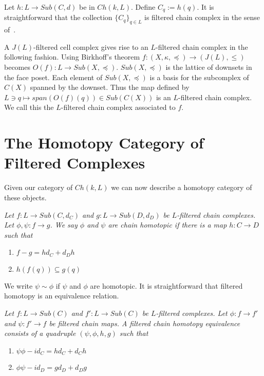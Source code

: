 \begin{rem}
Let $h:L\to Sub(C,d)$ be in $Ch(k,L)$.  Define $C_q := h(q)$. It is straightforward that the collection $\{C_q\}_{q\in L}$ is filtered chain complex in the sense of~\cite[Section 7]{salamon}.
\end{rem}


A $J(L)$-filtered cell complex gives rise to an $L$-filtered chain complex in the following fashion.   Using Birkhoff's theorem $f:(X,\kappa,\preceq)\to (J(L),\leq)$ becomes $O(f):L\to Sub(X,\preceq)$.  $Sub(X,\preceq)$ is the lattice of downsets in the face poset.  Each element of $Sub(X,\preceq)$ is a basis for the subcomplex of $C(X)$ spanned by the downset.   Thus the map defined by $L\ni q\mapsto span(O(f)(q))\in Sub(C(X))$ is an $L$-filtered chain complex.  We call this the $L$-filtered chain complex associated to $f$.




\section{The Homotopy Category of Filtered Complexes}\label{sec:homotopy}

Given our category of $Ch(k,L)$ we can now describe a homotopy category of these objects.

\begin{defn}
{\em
Let $f:L\to Sub(C,d_C)$ and $g:L\to Sub(D,d_D)$ be $L$-filtered chain complexes.  Let $\phi,\psi:f\to g$.  We say $\phi$ and $\psi$ are {\em chain homotopic} if there is a map $h:C\to D$ such that
\begin{enumerate}
\item $f-g = hd_C+d_Dh$
\item $h(f(q))\subseteq g(q)$
\end{enumerate}  
}
\end{defn}

We write $\psi\sim \phi$ if $\psi$ and $\phi$ are homotopic.  It is straightforward that filtered homotopy is an equivalence relation.  

\begin{defn}
{\em
Let $f:L\to Sub(C)$ and $f':L\to Sub(C)$ be $L$-filtered complexes.  Let $\phi:f\to f'$ and $\psi:f'\to f$ be filtered chain maps.  A {\em filtered chain homotopy equivalence} consists of a quadruple $(\psi,\phi,h,g)$ such that 
\begin{enumerate}
\item $\psi\phi-id_C= hd_C + d_Ch$
\item $\phi\psi-id_D = gd_D+d_Dg$
\end{enumerate}
}
\end{defn}


